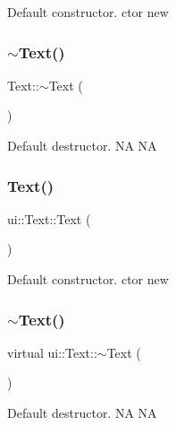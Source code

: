 Default constructor.  ctor  new \mbox{\label{classui_1_1Text_a2d49e5c280e205125b149f7777ae30c7}} 
\subsubsection{\texorpdfstring{$\sim$\+Text()}{~Text()}\hspace{0.1cm}{\footnotesize\ttfamily [1/2]}}
{\footnotesize\ttfamily Text\+::$\sim$\+Text (\begin{DoxyParamCaption}{ }\end{DoxyParamCaption})\hspace{0.3cm}{\ttfamily [virtual]}}

Default destructor.  NA  NA \mbox{\label{classui_1_1Text_aa48e386c0963d21ee49737dd33ade66c}} 
\subsubsection{\texorpdfstring{Text()}{Text()}\hspace{0.1cm}{\footnotesize\ttfamily [2/2]}}
{\footnotesize\ttfamily ui\+::\+Text\+::\+Text (\begin{DoxyParamCaption}{ }\end{DoxyParamCaption})}

Default constructor.  ctor  new \mbox{\label{classui_1_1Text_a3022f24c5b895f8b50bd8f03b3ed08c0}} 
\subsubsection{\texorpdfstring{$\sim$\+Text()}{~Text()}\hspace{0.1cm}{\footnotesize\ttfamily [2/2]}}
{\footnotesize\ttfamily virtual ui\+::\+Text\+::$\sim$\+Text (\begin{DoxyParamCaption}{ }\end{DoxyParamCaption})\hspace{0.3cm}{\ttfamily [virtual]}}

Default destructor.  NA  NA 

